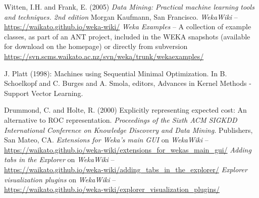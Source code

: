 %
%
%
%


\begin{thebibliography}{999}

		Witten, I.H. and Frank, E. (2005) \textit{Data Mining: Practical machine
		learning tools and techniques. 2nd edition}  Morgan Kaufmann, San
		Francisco.
		\textit{WekaWiki} -- \url{https://waikato.github.io/weka-wiki/}{}
		\textit{Weka Examples} -- A collection of example classes, as part of
an ANT project, included in the WEKA snapshots (available for download on the
homepage) or directly from subversion
\url{https://svn.scms.waikato.ac.nz/svn/weka/trunk/wekaexamples/}{}

		J. Platt (1998): Machines using Sequential Minimal Optimization. In B. Schoelkopf and C. Burges and A. Smola, editors, Advances in Kernel Methods - Support Vector Learning.

		Drummond, C. and Holte, R. (2000) Explicitly representing expected cost: An alternative to ROC representation.
		\textit{Proceedings of the Sixth ACM SIGKDD International Conference on Knowledge Discovery and Data Mining.}
		Publishers, San Mateo, CA.
		\textit{Extensions for Weka's main GUI} on \textit{WekaWiki} -- \\
		\small{\url{https://waikato.github.io/weka-wiki/extensions_for_wekas_main_gui/}{}}
		\textit{Adding tabs in the Explorer} on \textit{WekaWiki} -- \\
		\small{\url{https://waikato.github.io/weka-wiki/adding_tabs_in_the_explorer/}{}}
		\textit{Explorer visualization plugins} on \textit{WekaWiki} -- \\
		\small{\url{https://waikato.github.io/weka-wiki/explorer_visualization_plugins/}{}}


\end{thebibliography}
